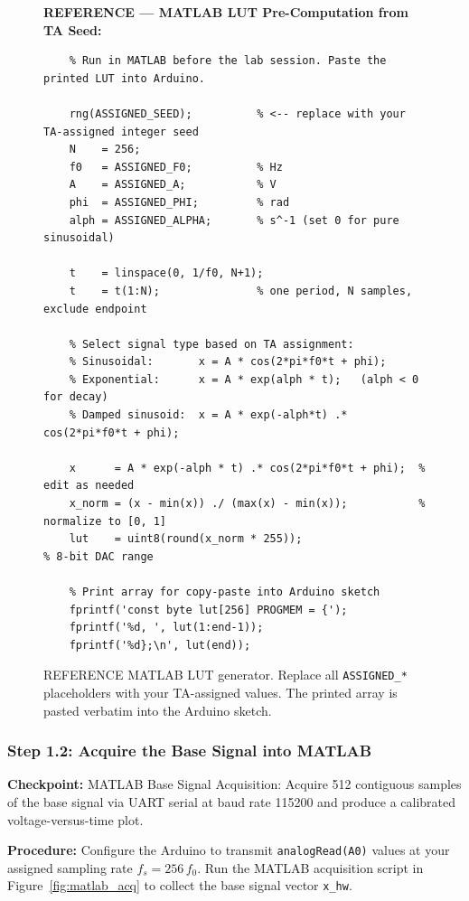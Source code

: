 \documentclass[11pt,letterpaper]{article}
\providecommand{\cpECE}[1]{\textcolor{OliveGreen}{\textbf{Checkpoint:} #1}}
\begin{document}
\begin{figure}[H]
    \centering
    \vspace{0.3in}
    \textbf{REFERENCE --- MATLAB LUT Pre-Computation from TA Seed:}
    \begin{verbatim}
    % Run in MATLAB before the lab session. Paste the printed LUT into Arduino.

    rng(ASSIGNED_SEED);          % <-- replace with your TA-assigned integer seed
    N    = 256;
    f0   = ASSIGNED_F0;          % Hz
    A    = ASSIGNED_A;           % V
    phi  = ASSIGNED_PHI;         % rad
    alph = ASSIGNED_ALPHA;       % s^-1 (set 0 for pure sinusoidal)

    t    = linspace(0, 1/f0, N+1);
    t    = t(1:N);               % one period, N samples, exclude endpoint

    % Select signal type based on TA assignment:
    % Sinusoidal:       x = A * cos(2*pi*f0*t + phi);
    % Exponential:      x = A * exp(alph * t);   (alph < 0 for decay)
    % Damped sinusoid:  x = A * exp(-alph*t) .* cos(2*pi*f0*t + phi);

    x      = A * exp(-alph * t) .* cos(2*pi*f0*t + phi);  % edit as needed
    x_norm = (x - min(x)) ./ (max(x) - min(x));           % normalize to [0, 1]
    lut    = uint8(round(x_norm * 255));                   % 8-bit DAC range

    % Print array for copy-paste into Arduino sketch
    fprintf('const byte lut[256] PROGMEM = {');
    fprintf('%d, ', lut(1:end-1));
    fprintf('%d};\n', lut(end));
    \end{verbatim}
    \vspace{0.2in}
    \caption{REFERENCE MATLAB LUT generator. Replace all \texttt{ASSIGNED\_*} placeholders with your TA-assigned values. The printed array is pasted verbatim into the Arduino sketch.}
    \label{fig:matlab_lut_gen}
\end{figure}

\subsubsection{Step 1.2: Acquire the Base Signal into MATLAB}
\cpECE{MATLAB Base Signal Acquisition:} Acquire 512 contiguous samples of the base signal via UART serial at baud rate 115200 and produce a calibrated voltage-versus-time plot.

\textbf{Procedure:}
Configure the Arduino to transmit \texttt{analogRead(A0)} values at your assigned sampling rate $f_s = 256\,f_0$. Run the MATLAB acquisition script in Figure~\ref{fig:matlab_acq} to collect the base signal vector \texttt{x\_hw}.
\end{document}
